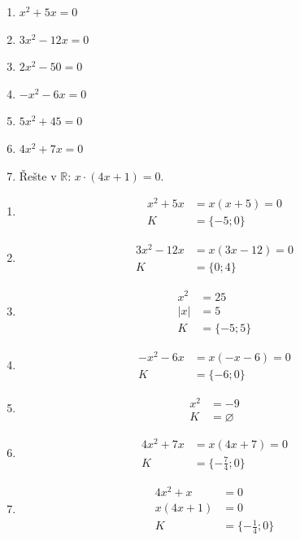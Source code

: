 \documentclass[11pt,a4paper]{article}
\begin{document}
\begin{zadaniReseniBox}[title={Domácí úkol}]
\begin{enumerate}[label=\alph*),itemsep=2pt]
\item $x^{2} + 5x=0$
\item $3x^{2} - 12x=0$
\item $2x^{2} - 50=0$
\item $- x^{2} - 6x=0$
\item $5x^{2} + 45=0$
\item $4x^{2} + 7x=0$
\item Řešte v $\mathbb R$: $x \cdot \left(4x + 1\right)=0$.
\end{enumerate}
\tcblower
\begin{enumerate}[label=\alph*),itemsep=2pt]
\item
\[\begin{aligned}
x^{2} + 5x&=x(x + 5)=0\\[2pt]
K&=\{-5;0\}
\end{aligned}\]
\item
\[\begin{aligned}
3x^{2} - 12x&=x(3x - 12)=0\\[2pt]
K&=\{0;4\}
\end{aligned}\]
\item
\[\begin{aligned}
x^2&=25\\|x|&=5\\[2pt]
K&=\{-5;5\}
\end{aligned}\]
\item
\[\begin{aligned}
- x^{2} - 6x&=x(- x - 6)=0\\[2pt]
K&=\{-6;0\}
\end{aligned}\]
\item
\[\begin{aligned}
x^2&=-9\\[2pt]
K&=\varnothing
\end{aligned}\]
\item
\[\begin{aligned}
4x^{2} + 7x&=x(4x + 7)=0\\[2pt]
K&=\{- \frac{7}{4};0\}
\end{aligned}\]
\item \[ \begin{aligned}4x^2+x&=0\\x(4x+1)&=0\\K&=\{-\frac14;0\}\end{aligned}\]
\end{enumerate}
\end{zadaniReseniBox}
\end{document}
